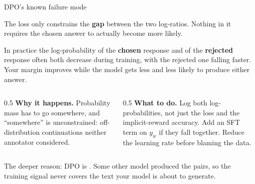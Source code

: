 \documentclass[aspectratio=169,10pt]{beamer}
\begin{document}
\begin{frame}{DPO's known failure mode}
  \begin{gotcha}
    The loss only constrains the \textbf{gap} between the two log-ratios.
    Nothing in it requires the chosen answer to actually become more likely.
    \vspace{0.3em}

    In practice the log-probability of the \textbf{chosen} response and of the
    \textbf{rejected} response often both decrease during training, with the
    rejected one falling faster. Your margin improves while the model gets
    less and less likely to produce either answer.
  \end{gotcha}
  \vspace{0.4em}
  \begin{columns}[T]
    \begin{column}{0.5\textwidth}
      \small
      \textbf{Why it happens.} Probability mass has to go somewhere, and
      ``somewhere'' is unconstrained: off-distribution continuations neither
      annotator considered.
    \end{column}
    \begin{column}{0.5\textwidth}
      \small
      \textbf{What to do.} Log both log-probabilities, not just the loss and
      the implicit-reward accuracy. Add an SFT term on $y_w$ if they fall
      together. Reduce the learning rate before blaming the data.
    \end{column}
  \end{columns}
  \vspace{0.4em}
  \raggedright
  \small
  The deeper reason: DPO is . Some other model produced the
  pairs, so the training signal never covers the text your model is about to
  generate.
\end{frame}
\end{document}
